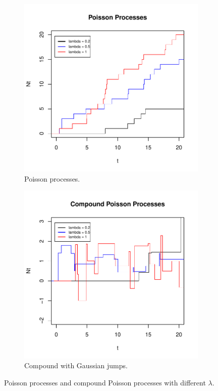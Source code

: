\begin{figure}
	\centering
	\begin{subfigure}{.5\textwidth}
		\centering
		\includegraphics[width=\linewidth]{Images/poisson_process.pdf}
		\caption{Poisson processes.}
		\label{fig:pois}
	\end{subfigure}%
	\begin{subfigure}{.5\textwidth}
		\centering
		\includegraphics[width=\linewidth]{Images/compound_poisson_process.pdf}
		\caption{Compound with Gaussian jumps.}
		\label{fig:compound_pois}
	\end{subfigure}
	\caption[Trajectories of Poisson processes]{Poisson processes and compound Poisson processes with different $\lambda$.}
	\label{fig:pois_process}
\end{figure}

